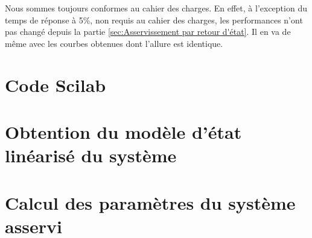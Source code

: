 \documentclass[a4paper,12pt]{article}
\begin{document}
    \par Nous sommes toujours conformes au cahier des charges.
    En effet, à l'exception du temps de réponse à 5\%, non requis au cahier des charges, les performances n'ont pas changé depuis la partie \ref{sec:Asservissement par retour d'état}.
    Il en va de même avec les courbes obtenues dont l'allure est identique.
  \newpage


	\appendix
		\section{Code Scilab}
    \label{sec:Code Scilab}
		\begin{center}
			
			
			
		\end{center}

		\section{Obtention du modèle d'état linéarisé du système}
		\label{sec:Obtention du modèle d'état linéarisé du système}
		\newpage

    \section{Calcul des paramètres du système asservi}
    \label{sec:Calcul des paramètres du système asservi}
    \newpage
\end{document}
